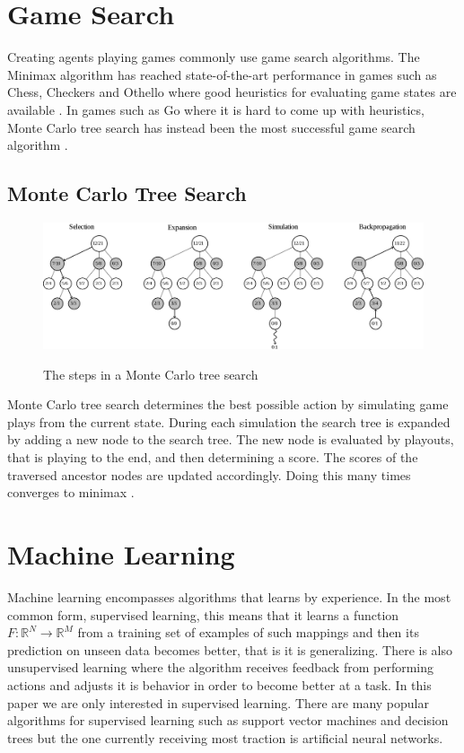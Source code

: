 \documentclass{kththesis}
\begin{document}
\section{Game Search}
Creating agents playing games commonly use game search algorithms.  The Minimax algorithm has reached state-of-the-art performance in games such as Chess, Checkers and Othello where good heuristics for evaluating game states are available \cite{alphaGo2016}. In games such as Go where it is hard to come up with heuristics, Monte Carlo tree search has instead been the most successful game search algorithm \cite{goMoveEvaluation2014}. 
\subsection{Monte Carlo Tree Search}

\begin{figure}
\includegraphics[width=\textwidth]{images/mcst.png}
\label{fig:mcts-steps}
\caption{The steps in a Monte Carlo tree search}
\end{figure}

Monte Carlo tree search  determines the best possible action by simulating game plays from the current state.  During each simulation the search tree is expanded by adding a new node to the search tree. The new node is evaluated by playouts, that is playing to the end, and then determining a score. The scores of the traversed ancestor nodes are updated accordingly. Doing this many times converges to minimax \cite{browne2012survey}.

\section{Machine Learning}
Machine learning  encompasses algorithms that learns by experience. In the most common form, supervised learning, this means that  it learns a function $F: \mathbb{R}^{N} \rightarrow \mathbb{R}^{M}$ from a training set of examples of such mappings and then its prediction on unseen data becomes better, that is it is generalizing. There is also unsupervised learning where the algorithm receives feedback from performing actions and adjusts it is behavior in order to become better at a task. In this paper we are only interested in supervised learning. There are many popular algorithms for supervised learning such as support vector machines and decision trees  but the  one currently receiving most traction is artificial neural networks. 
\end{document}
